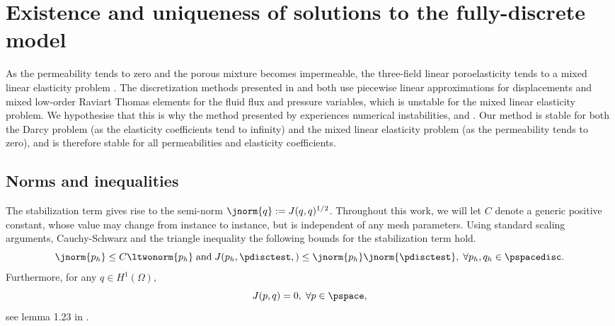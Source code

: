 \section{Existence and uniqueness of solutions to the fully-discrete model}
\label{sec:stability}

As the permeability tends to zero and the porous mixture becomes impermeable, the three-field linear poroelasticity tends to a mixed linear elasticity problem \cite{haga2012causes}. The discretization methods presented in \cite{phillips2007couplingtwo} and \cite{lipnikov2002numerical} both use piecewise linear approximations for displacements and mixed low-order Raviart Thomas elements for the fluid flux and pressure variables, which is unstable for the mixed linear elasticity problem. We hypothesise that this is why the method presented by \cite{phillips2007couplingtwo} experiences numerical instabilities, \cite{phillips2008couplingdiscontinuous} and \cite{phillips2009overcoming}.
Our method is stable for both the Darcy problem (as the elasticity coefficients tend to infinity) and the mixed linear elasticity problem (as the permeability tends to zero), and  is therefore stable for all permeabilities and elasticity coefficients.


\subsection{Norms and inequalities}
\label{sec:norms_inequalities}

The stabilization term gives rise to the semi-norm $\jnorm{q}:=J(q,q)^{1/2}$. Throughout this work, we will let $C$ denote a generic positive constant, whose value may change from instance to instance, but is independent of any mesh parameters. Using standard scaling arguments, Cauchy-Schwarz and the triangle inequality the following bounds for the stabilization term hold.
\begin{equation}
\label{J_bound}
\jnorm{p_h} \leq C\ltwonorm{p_h} \; \mbox{and} \; 
J(p_h,\pdisctest,)  \leq  \jnorm{p_h}\jnorm{\pdisctest}, \; \forall  p_h, q_h \in \pspacedisc.
\end{equation}
Furthermore, for any   $q \in H^{1}(\Omega)$,
\begin{equation}
\label{zero_jump}
J(p,q) = 0 , \; \forall p \in \pspace ,
\end{equation}
see lemma 1.23 in \cite{di2011mathematical}.

